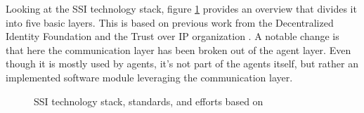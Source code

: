     	Looking at the \ac{SSI} technology stack, figure \ref{figure: ssi_stack_detail} provides an overview that divides it into five basic layers. This is based on previous work from the Decentralized Identity Foundation and the Trust over IP organization \cite{heck_ssi_2020,yildiz_layers_2021,davie_0289_2021}. A notable change is that here the communication layer has been broken out of the agent layer. Even though it is mostly used by agents, it's not part of the agents itself, but rather an implemented software module leveraging the communication layer.
    	
		\begin{figure}[ht]
            \centering
            \caption{\ac{SSI} technology stack, standards, and efforts based on  \cite{heck_ssi_2020, yildiz_layers_2021,davie_0289_2021}}
            \label{figure: ssi_stack_detail}
        \end{figure}
        
